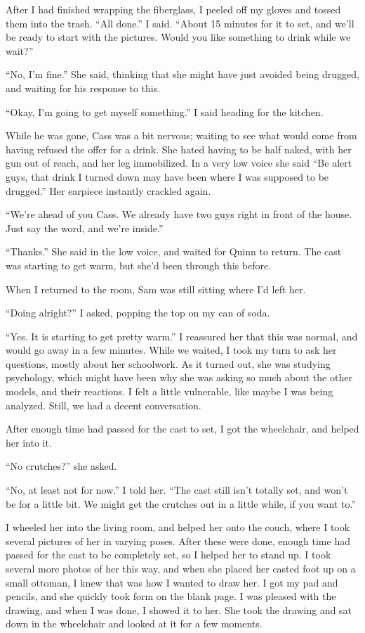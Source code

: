 After I had finished wrapping the fiberglass, I peeled off my gloves and tossed them into
the trash. ``All done.'' I said. ``About 15 minutes for it to set, and we'll be ready to start
with the pictures. Would you like something to drink while we wait?''

``No, I'm fine.'' She said, thinking that she might have just avoided being drugged, and
waiting for his response to this.

``Okay, I'm going to get myself something.'' I said heading for the kitchen.

While he was gone, Cass was a bit nervous; waiting to see what would come from having
refused the offer for a drink. She hated having to be half naked, with her gun out of reach, and
her leg immobilized. In a very low voice she said ``Be alert guys, that drink I turned down may
have been where I was supposed to be drugged.'' Her earpiece instantly crackled again.

``We're ahead of you Cass. We already have two guys right in front of the house. Just say
the word, and we're inside.''

``Thanks.'' She said in the low voice, and waited for Quinn to return. The cast was
starting to get warm, but she'd been through this before.

When I returned to the room, Sam was still sitting where I'd left her.

``Doing alright?'' I asked, popping the top on my can of soda.

``Yes. It is starting to get pretty warm.'' I reassured her that this was normal, and
would go away in a few minutes. While we waited, I took my turn to ask her questions, mostly
about her schoolwork. As it turned out, she was studying psychology, which might have been why
she was asking so much about the other models, and their reactions. I felt a little vulnerable,
like maybe I was being analyzed. Still, we had a decent conversation.

After enough time had passed for the cast to set, I got the wheelchair, and helped her
into it.

``No crutches?'' she asked.

``No, at least not for now.'' I told her. ``The cast still isn't totally set, and won't be
for a little bit. We might get the crutches out in a little while, if you want to.''

I wheeled her into the living room, and helped her onto the couch, where I took several
pictures of her in varying poses. After these were done, enough time had passed for the cast to
be completely set, so I helped her to stand up. I took several more photos of her this way, and
when she placed her casted foot up on a small ottoman, I knew that was how I wanted to draw her.
I got my pad and pencils, and she quickly took form on the blank page. I was pleased with the
drawing, and when I was done, I showed it to her. She took the drawing and sat down in the
wheelchair and looked at it for a few moments.

